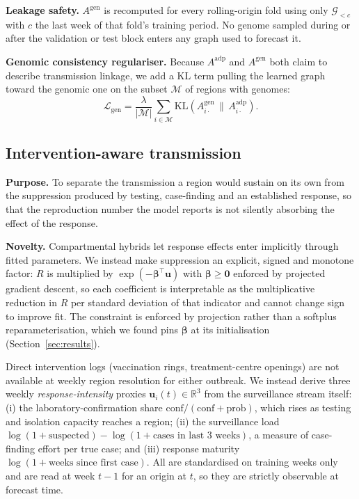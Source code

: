 \documentclass[conference]{IEEEtran}
\newcommand{\bR}{\mathbb{R}}
\begin{document}
\textbf{Leakage safety.} $A^{\mathrm{gen}}$ is recomputed for every rolling-origin fold using only $\mathcal{G}_{<c}$ with $c$ the last week of that fold's training period. No genome sampled during or after the validation or test block enters any graph used to forecast it.

\textbf{Genomic consistency regulariser.} Because $A^{\mathrm{adp}}$ and $A^{\mathrm{gen}}$ both claim to describe transmission linkage, we add a KL term pulling the learned graph toward the genomic one on the subset $\mathcal{M}$ of regions with genomes:
\begin{equation}
\mathcal{L}_{\mathrm{gen}} = \frac{\lambda}{|\mathcal{M}|}\sum_{i\in\mathcal{M}} \mathrm{KL}\!\left(A^{\mathrm{gen}}_{i\cdot}\,\|\,A^{\mathrm{adp}}_{i\cdot}\right).
\label{eq:kl}
\end{equation}

\subsection{Intervention-aware transmission}\label{sec:interv}

\textbf{Purpose.} To separate the transmission a region would sustain on its own from the suppression produced by testing, case-finding and an established response, so that the reproduction number the model reports is not silently absorbing the effect of the response.

\textbf{Novelty.} Compartmental hybrids let response effects enter implicitly through fitted parameters. We instead make suppression an explicit, signed and monotone factor: $R$ is multiplied by $\exp(-\boldsymbol{\beta}^{\top}\mathbf{u})$ with $\boldsymbol{\beta}\geq\mathbf{0}$ enforced by projected gradient descent, so each coefficient is interpretable as the multiplicative reduction in $R$ per standard deviation of that indicator and cannot change sign to improve fit. The constraint is enforced by projection rather than a softplus reparameterisation, which we found pins $\boldsymbol{\beta}$ at its initialisation (Section~\ref{sec:results}).


Direct intervention logs (vaccination rings, treatment-centre openings) are not available at weekly region resolution for either outbreak. We instead derive three weekly \emph{response-intensity} proxies $\mathbf{u}_i(t)\in\bR^3$ from the surveillance stream itself: (i) the laboratory-confirmation share $\mathrm{conf}/(\mathrm{conf}+\mathrm{prob})$, which rises as testing and isolation capacity reaches a region; (ii) the surveillance load $\log(1+\text{suspected})-\log(1+\text{cases in last 3 weeks})$, a measure of case-finding effort per true case; and (iii) response maturity $\log(1+\text{weeks since first case})$. All are standardised on training weeks only and are read at week $t-1$ for an origin at $t$, so they are strictly observable at forecast time.
\end{document}
